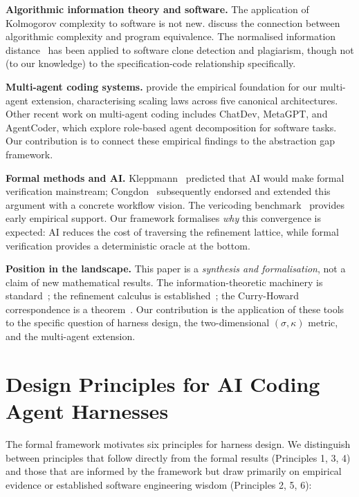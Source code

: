 \documentclass[11pt, a4paper, copyright]{googledeepmind}
\begin{document}
\textbf{Algorithmic information theory and software.} The application of Kolmogorov complexity to software is not new. \citet{li2019introduction} discuss the connection between algorithmic complexity and program equivalence. The normalised information distance~\citep{li2004similarity} has been applied to software clone detection and plagiarism, though not (to our knowledge) to the specification-code relationship specifically.

\textbf{Multi-agent coding systems.} \citet{kim2025scaling} provide the empirical foundation for our multi-agent extension, characterising scaling laws across five canonical architectures. Other recent work on multi-agent coding includes ChatDev, MetaGPT, and AgentCoder, which explore role-based agent decomposition for software tasks. Our contribution is to connect these empirical findings to the abstraction gap framework.

\textbf{Formal methods and AI.} Kleppmann~\citep{kleppmann2025formal} predicted that AI would make formal verification mainstream; Congdon~\citep{congdon2025formal} subsequently endorsed and extended this argument with a concrete workflow vision. The vericoding benchmark~\citep{vericoding2025} provides early empirical support. Our framework formalises \emph{why} this convergence is expected: AI reduces the cost of traversing the refinement lattice, while formal verification provides a deterministic oracle at the bottom.

\textbf{Position in the landscape.} This paper is a \emph{synthesis and formalisation}, not a claim of new mathematical results. The information-theoretic machinery is standard~\citep{li2019introduction}; the refinement calculus is established~\citep{back1980correctness, morgan1994programming}; the Curry-Howard correspondence is a theorem~\citep{wadler2015propositions}. Our contribution is the application of these tools to the specific question of harness design, the two-dimensional $(\sigma, \kappa)$ metric, and the multi-agent extension.


\section{Design Principles for AI Coding Agent Harnesses}
\label{sec:design-principles}

The formal framework motivates six principles for harness design. We distinguish between principles that follow directly from the formal results (Principles 1, 3, 4) and those that are informed by the framework but draw primarily on empirical evidence or established software engineering wisdom (Principles 2, 5, 6):
\end{document}

